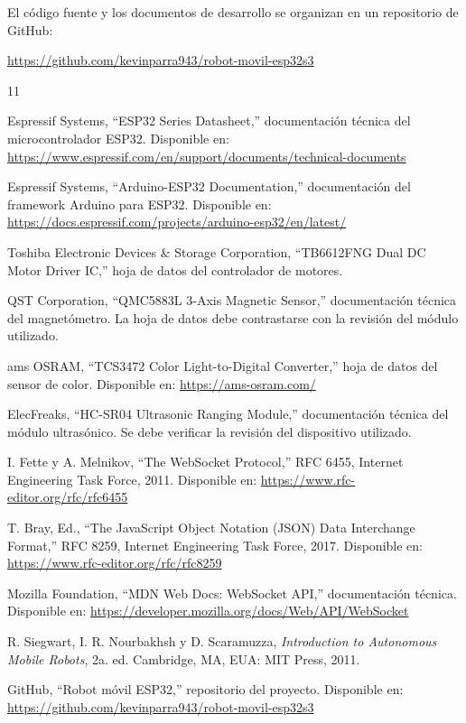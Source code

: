 \documentclass[journal]{IEEEtran}
\begin{document}
El código fuente y los documentos de desarrollo se organizan en un repositorio de GitHub:

\begin{center}
\url{https://github.com/kevinparra943/robot-movil-esp32s3}
\end{center}


\ifCLASSOPTIONcaptionsoff
  \newpage
\fi

\begin{thebibliography}{11}

Espressif Systems, ``ESP32 Series Datasheet,'' documentación técnica del microcontrolador ESP32. Disponible en: \url{https://www.espressif.com/en/support/documents/technical-documents}

Espressif Systems, ``Arduino-ESP32 Documentation,'' documentación del framework Arduino para ESP32. Disponible en: \url{https://docs.espressif.com/projects/arduino-esp32/en/latest/}

Toshiba Electronic Devices \& Storage Corporation, ``TB6612FNG Dual DC Motor Driver IC,'' hoja de datos del controlador de motores.

QST Corporation, ``QMC5883L 3-Axis Magnetic Sensor,'' documentación técnica del magnetómetro. La hoja de datos debe contrastarse con la revisión del módulo utilizado.

ams OSRAM, ``TCS3472 Color Light-to-Digital Converter,'' hoja de datos del sensor de color. Disponible en: \url{https://ams-osram.com/}

ElecFreaks, ``HC-SR04 Ultrasonic Ranging Module,'' documentación técnica del módulo ultrasónico. Se debe verificar la revisión del dispositivo utilizado.

I. Fette y A. Melnikov, ``The WebSocket Protocol,'' RFC 6455, Internet Engineering Task Force, 2011. Disponible en: \url{https://www.rfc-editor.org/rfc/rfc6455}

T. Bray, Ed., ``The JavaScript Object Notation (JSON) Data Interchange Format,'' RFC 8259, Internet Engineering Task Force, 2017. Disponible en: \url{https://www.rfc-editor.org/rfc/rfc8259}

Mozilla Foundation, ``MDN Web Docs: WebSocket API,'' documentación técnica. Disponible en: \url{https://developer.mozilla.org/docs/Web/API/WebSocket}

R. Siegwart, I. R. Nourbakhsh y D. Scaramuzza, \emph{Introduction to Autonomous Mobile Robots}, 2a. ed. Cambridge, MA, EUA: MIT Press, 2011.

GitHub, ``Robot móvil ESP32,'' repositorio del proyecto. Disponible en: \url{https://github.com/kevinparra943/robot-movil-esp32s3}

\end{thebibliography}
\end{document}

